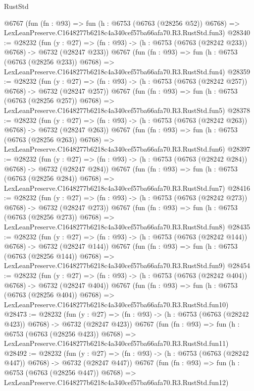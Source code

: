 \begin{lexlean}{RustStd}
\begin{coremodule}
    @6767
    (fun (fn : @93) =>
    fun (h : @6753 (@6763 (@28256 @52)) @6768) =>
    LexLeanPreserve.C1648277b6218c4a340cef57ba66afa70.R3.RustStd.fun3)
@28340 := @28232
    (fun (y : @27) => (fn : @93) -> (h : @6753 (@6763 (@28242 @233)) @6768) -> @6732 (@28247 @233))
    @6767
    (fun (fn : @93) =>
    fun (h : @6753 (@6763 (@28256 @233)) @6768) =>
    LexLeanPreserve.C1648277b6218c4a340cef57ba66afa70.R3.RustStd.fun4)
@28359 := @28232
    (fun (y : @27) => (fn : @93) -> (h : @6753 (@6763 (@28242 @257)) @6768) -> @6732 (@28247 @257))
    @6767
    (fun (fn : @93) =>
    fun (h : @6753 (@6763 (@28256 @257)) @6768) =>
    LexLeanPreserve.C1648277b6218c4a340cef57ba66afa70.R3.RustStd.fun5)
@28378 := @28232
    (fun (y : @27) => (fn : @93) -> (h : @6753 (@6763 (@28242 @263)) @6768) -> @6732 (@28247 @263))
    @6767
    (fun (fn : @93) =>
    fun (h : @6753 (@6763 (@28256 @263)) @6768) =>
    LexLeanPreserve.C1648277b6218c4a340cef57ba66afa70.R3.RustStd.fun6)
@28397 := @28232
    (fun (y : @27) => (fn : @93) -> (h : @6753 (@6763 (@28242 @284)) @6768) -> @6732 (@28247 @284))
    @6767
    (fun (fn : @93) =>
    fun (h : @6753 (@6763 (@28256 @284)) @6768) =>
    LexLeanPreserve.C1648277b6218c4a340cef57ba66afa70.R3.RustStd.fun7)
@28416 := @28232
    (fun (y : @27) => (fn : @93) -> (h : @6753 (@6763 (@28242 @273)) @6768) -> @6732 (@28247 @273))
    @6767
    (fun (fn : @93) =>
    fun (h : @6753 (@6763 (@28256 @273)) @6768) =>
    LexLeanPreserve.C1648277b6218c4a340cef57ba66afa70.R3.RustStd.fun8)
@28435 := @28232
    (fun (y : @27) => (fn : @93) -> (h : @6753 (@6763 (@28242 @144)) @6768) -> @6732 (@28247 @144))
    @6767
    (fun (fn : @93) =>
    fun (h : @6753 (@6763 (@28256 @144)) @6768) =>
    LexLeanPreserve.C1648277b6218c4a340cef57ba66afa70.R3.RustStd.fun9)
@28454 := @28232
    (fun (y : @27) => (fn : @93) -> (h : @6753 (@6763 (@28242 @404)) @6768) -> @6732 (@28247 @404))
    @6767
    (fun (fn : @93) =>
    fun (h : @6753 (@6763 (@28256 @404)) @6768) =>
    LexLeanPreserve.C1648277b6218c4a340cef57ba66afa70.R3.RustStd.fun10)
@28473 := @28232
    (fun (y : @27) => (fn : @93) -> (h : @6753 (@6763 (@28242 @423)) @6768) -> @6732 (@28247 @423))
    @6767
    (fun (fn : @93) =>
    fun (h : @6753 (@6763 (@28256 @423)) @6768) =>
    LexLeanPreserve.C1648277b6218c4a340cef57ba66afa70.R3.RustStd.fun11)
@28492 := @28232
    (fun (y : @27) => (fn : @93) -> (h : @6753 (@6763 (@28242 @447)) @6768) -> @6732 (@28247 @447))
    @6767
    (fun (fn : @93) =>
    fun (h : @6753 (@6763 (@28256 @447)) @6768) =>
    LexLeanPreserve.C1648277b6218c4a340cef57ba66afa70.R3.RustStd.fun12)

\end{coremodule}
\end{lexlean}

